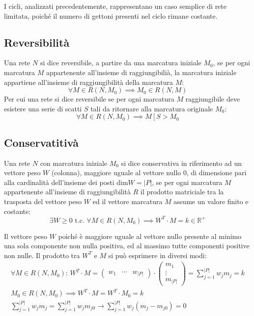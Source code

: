 \documentclass{article}
\numberwithin{equation}{subsection}
\begin{document}
I cicli, analizzati precedentemente, rappresentano un caso semplice di rete limitata, poiché il numero di gettoni presenti nel ciclo rimane costante. 

\subsection{Reversibilità}

Una rete $N$ si dice reversibile, a partire da una marcatura iniziale $M_0$, se per ogni marcatura $M$ appartenente all'insieme di raggiungibilià, la marcatura iniziale 
appartiene all'insieme di raggiungibilità della marcatura $M$:
\begin{equation*}
    \forall M\in R(N,M_0)\implies M_0\in R(N,M)
\end{equation*}
Per cui una rete si dice reversibile se per ogni marcatura $M$ raggiungibile deve esistere una serie di scatti $S$ tali da ritornare alla marcatura originale $M_0$:
\begin{equation*}
    \forall M\in R(N,M_0)\implies M\left[\right.S>M_0
\end{equation*} 

\subsection{Conservatitivà}

Una rete $N$ con marcatura iniziale $M_0$ si dice conservativa in riferimento ad un vettore peso $W$ (colonna), maggiore uguale al vettore nullo $0$, di dimensione pari alla 
cardinalità dell'insieme dei posti $\mbox{dim} W=|P|$, se per ogni marcatura $M$ appartenente all'insieme di raggiungibilità $R$ il prodotto matriciale tra la trasposta del 
vettore peso $W$ ed il vettore marcatura $M$ assume un valore finito e costante:
\begin{equation*}
    \exists W\geq0\mbox{ t.c. }\forall M\in R(N,M_0)\implies W^T\cdot M=k\in\mathbb{R}^+
\end{equation*}


Il vettore peso $W$ poiché è maggiore uguale al vettore nullo presente al minimo una sola componente non nulla positiva, ed al massimo tutte componenti positive non nulle. Il 
prodotto tra $W^T$ e $M$ si può esprimere in diversi modi:
\begin{gather*}
    \forall M\in R(N,M_0):\,W^T\cdot M=\begin{pmatrix}
        w_1&\cdots&w_{|P|}
    \end{pmatrix}\cdot\begin{pmatrix}
        m_1\\
        \vdots\\
        m_{|P|}
    \end{pmatrix}=\displaystyle\sum_{j=1}^{|P|}w_jm_j=k\\
    M_0\in R(N,M_0)\implies W^T\cdot M=W^T\cdot M_0=k\\
    \displaystyle\sum_{j=1}^{|P|}w_jm_j=\sum_{j=1}^{|P|}w_jm_{j0}\to \sum_{j=1}^{|P|}w_j(m_j-m_{j0})=0
\end{gather*}
\end{document}
